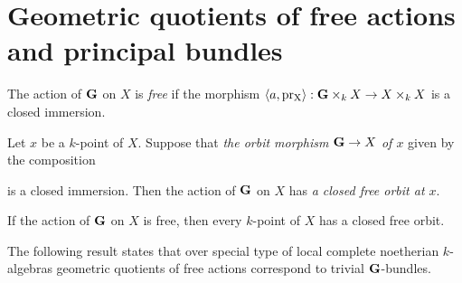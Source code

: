 \section{Geometric quotients of free actions and principal bundles}

\begin{definition}
The action of $\mathbf{G}$ on $X$ is \textit{free} if the morphism $\langle a, \mathrm{pr_X} \rangle:\mathbf{G}\times_kX\rightarrow X\times_kX$ is a closed immersion.
\end{definition}

\begin{definition}
Let $x$ be a $k$-point of $X$. Suppose that \textit{the orbit morphism $\mathbf{G}\rightarrow X$ of $x$} given by the composition
\begin{center}
\end{center}
is a closed immersion. Then the action of $\mathbf{G}$ on $X$ has \textit{a closed free orbit at $x$}.
\end{definition}

\begin{fact}\label{fact:all_k_points_have_free_closed_orbit_for_free_actions}
If the action of $\mathbf{G}$ on $X$ is free, then every $k$-point of $X$ has a closed free orbit.
\end{fact}
\noindent
The following result states that over special type of local complete noetherian $k$-algebras geometric quotients of free actions correspond to trivial $\mathbf{G}$-bundles. 

